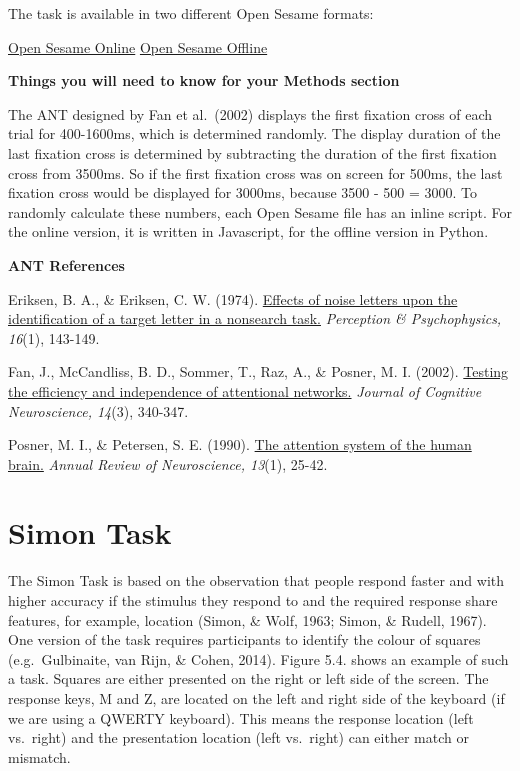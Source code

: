 \documentclass[
]{book}
\begin{document}
The task is available in two different Open Sesame formats:

\href{link\%20here}{Open Sesame Online} \textbar{} \href{link\%20here}{Open Sesame Offline}

\textbf{Things you will need to know for your Methods section}

The ANT designed by Fan et al.~(2002) displays the first fixation cross of each trial for 400-1600ms, which is determined randomly. The display duration of the last fixation cross is determined by subtracting the duration of the first fixation cross from 3500ms. So if the first fixation cross was on screen for 500ms, the last fixation cross would be displayed for 3000ms, because 3500 - 500 = 3000. To randomly calculate these numbers, each Open Sesame file has an inline script. For the online version, it is written in Javascript, for the offline version in Python.

\textbf{ANT References}

Eriksen, B. A., \& Eriksen, C. W. (1974). \href{https://link.springer.com/content/pdf/10.3758/BF03203267.pdf}{Effects of noise letters upon the identification of a target letter in a nonsearch task.} \emph{Perception \& Psychophysics, 16}(1), 143-149.

Fan, J., McCandliss, B. D., Sommer, T., Raz, A., \& Posner, M. I. (2002). \href{http://citeseerx.ist.psu.edu/viewdoc/download?doi=10.1.1.474.442\&rep=rep1\&type=pdf}{Testing the efficiency and independence of attentional networks.} \emph{Journal of Cognitive Neuroscience, 14}(3), 340-347.

Posner, M. I., \& Petersen, S. E. (1990). \href{https://apps.dtic.mil/dtic/tr/fulltext/u2/a206157.pdf}{The attention system of the human brain.} \emph{Annual Review of Neuroscience, 13}(1), 25-42.

\hypertarget{simon-task}{%
\section{Simon Task}\label{simon-task}}

The Simon Task is based on the observation that people respond faster and with higher accuracy if the stimulus they respond to and the required response share features, for example, location (Simon, \& Wolf, 1963; Simon, \& Rudell, 1967). One version of the task requires participants to identify the colour of squares (e.g.~Gulbinaite, van Rijn, \& Cohen, 2014). Figure 5.4. shows an example of such a task. Squares are either presented on the right or left side of the screen. The response keys, M and Z, are located on the left and right side of the keyboard (if we are using a QWERTY keyboard). This means the response location (left vs.~right) and the presentation location (left vs.~right) can either match or mismatch.
\end{document}
